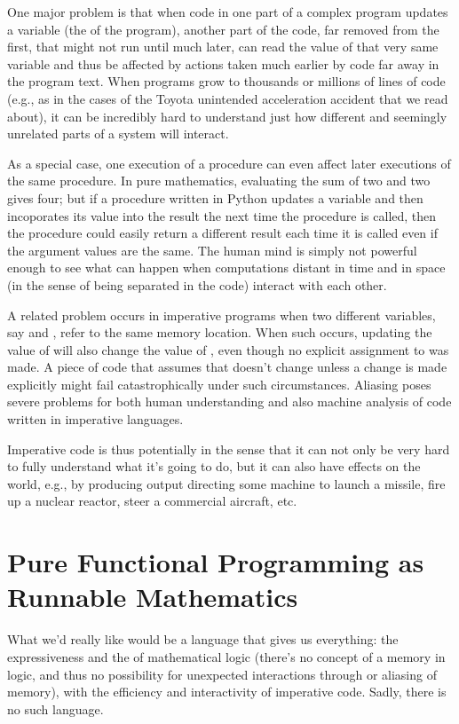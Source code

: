 \documentclass[letterpaper,10pt,english]{sphinxmanual}
\begin{document}
One major problem is that when code in one part of a complex program
updates a variable (the  of the program), another part of the
code, far removed from the first, that might not run until much later,
can read the value of that very same variable and thus be affected by
actions taken much earlier by code far away in the program text. When
programs grow to thousands or millions of lines of code (e.g., as in
the cases of the Toyota unintended acceleration accident that we read
about), it can be incredibly hard to understand just how different and
seemingly unrelated parts of a system will interact.

As a special case, one execution of a procedure can even affect later
executions of the same procedure. In pure mathematics, evaluating the
sum of two and two  gives four; but if a procedure written in
Python updates a  variable and then incoporates its value into
the result the next time the procedure is called, then the procedure
could easily return a different result each time it is called even if
the argument values are the same. The human mind is simply not powerful
enough to see what can happen when computations distant in time and in
space (in the sense of being separated in the code) interact with each
other.

A related problem occurs in imperative programs when two different
variables, say  and , refer to the same memory location. When
such  occurs, updating the value of  will also change the
value of , even though no explicit assignment to  was made. A
piece of code that assumes that  doesn’t change unless a change is
made explicitly might fail catastrophically under such circumstances.
Aliasing poses severe problems for both human understanding and also
machine analysis of code written in imperative languages.

Imperative code is thus potentially  in the sense that it can
not only be very hard to fully understand what it’s going to do, but
it can also have effects on the world, e.g., by producing output
directing some machine to launch a missile, fire up a nuclear reactor,
steer a commercial aircraft, etc.


\chapter{Pure Functional Programming as Runnable Mathematics}
\label{\detokenize{04-runnable-math::doc}}\label{\detokenize{04-runnable-math:pure-functional-programming-as-runnable-mathematics}}
What we’d really like would be a language that gives us everything:
the expressiveness and the  of mathematical logic (there’s no
concept of a memory in logic, and thus no possibility for unexpected
interactions through or aliasing of memory), with the efficiency and
interactivity of imperative code. Sadly, there is no such language.
\end{document}
